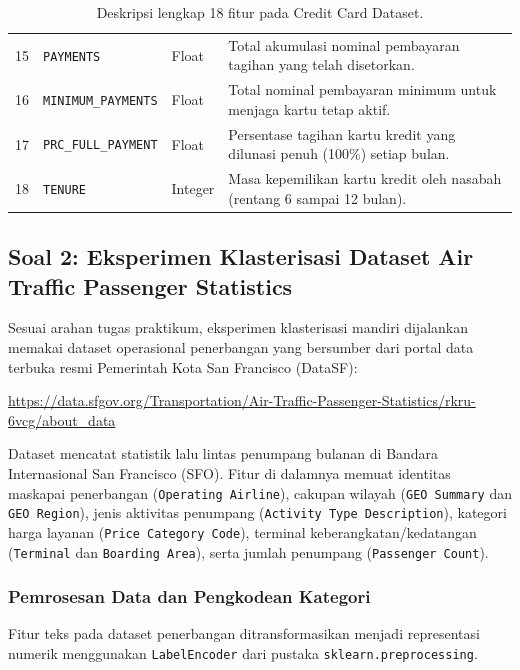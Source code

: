 \documentclass[a4paper,oneside,12pt]{report}
\begin{document}
\begin{table}[htbp]
\begin{tabularx}{\textwidth}{p{0.5cm} p{4.0cm} p{1.3cm} >{\raggedright\arraybackslash}X}
15 & \texttt{PAYMENTS} & Float & Total akumulasi nominal pembayaran tagihan yang telah disetorkan. \\
16 & \texttt{MINIMUM\_PAYMENTS} & Float & Total nominal pembayaran minimum untuk menjaga kartu tetap aktif. \\
17 & \texttt{PRC\_FULL\_PAYMENT} & Float & Persentase tagihan kartu kredit yang dilunasi penuh (100\%) setiap bulan. \\
18 & \texttt{TENURE} & Integer & Masa kepemilikan kartu kredit oleh nasabah (rentang 6 sampai 12 bulan). \\
\bottomrule
\end{tabularx}
\caption{Deskripsi lengkap 18 fitur pada Credit Card Dataset.}
\label{tab:deskripsi-fitur-cc}
\end{table}


\subsection{Soal 2: Eksperimen Klasterisasi Dataset Air Traffic Passenger Statistics}
Sesuai arahan tugas praktikum, eksperimen klasterisasi mandiri dijalankan memakai dataset operasional penerbangan yang bersumber dari portal data terbuka resmi Pemerintah Kota San Francisco (DataSF):
\begin{center}
\url{https://data.sfgov.org/Transportation/Air-Traffic-Passenger-Statistics/rkru-6vcg/about_data} \cite{sfgov-airtraffic}
\end{center}

Dataset mencatat statistik lalu lintas penumpang bulanan di Bandara Internasional San Francisco (SFO). Fitur di dalamnya memuat identitas maskapai penerbangan (\texttt{Operating Airline}), cakupan wilayah (\texttt{GEO Summary} dan \texttt{GEO Region}), jenis aktivitas penumpang (\texttt{Activity Type Description}), kategori harga layanan (\texttt{Price Category Code}), terminal keberangkatan/kedatangan (\texttt{Terminal} dan \texttt{Boarding Area}), serta jumlah penumpang (\texttt{Passenger Count}).

\subsubsection{Pemrosesan Data dan Pengkodean Kategori}
Fitur teks pada dataset penerbangan ditransformasikan menjadi representasi numerik menggunakan \texttt{LabelEncoder} dari pustaka \texttt{sklearn.preprocessing}.
\end{document}
